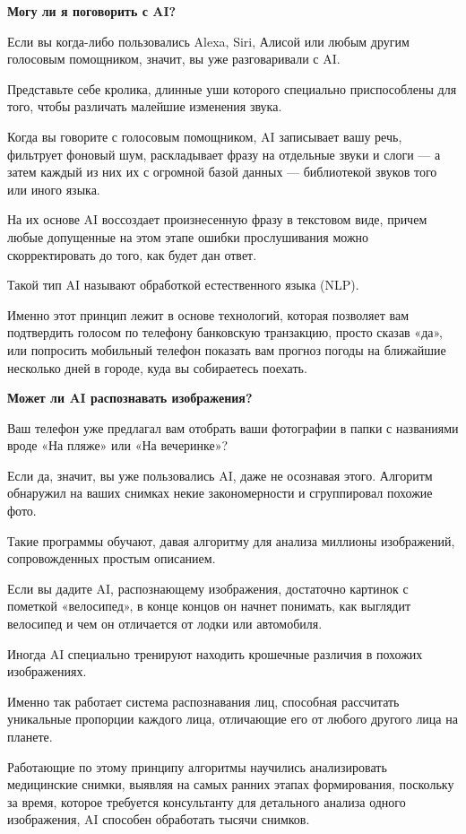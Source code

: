 \textbf{Могу ли я поговорить с AI?}

Если вы когда-либо пользовались Alexa, Siri, Алисой или любым другим голосовым помощником, значит, вы уже разговаривали с AI.

Представьте себе кролика, длинные уши которого специально приспособлены для того, чтобы различать малейшие изменения звука.

Когда вы говорите с голосовым помощником, AI записывает вашу речь, фильтрует фоновый шум, раскладывает фразу на отдельные звуки и слоги --- а затем  каждый из них их с огромной базой данных --- библиотекой звуков того или иного языка.

На их основе AI воссоздает произнесенную фразу в текстовом виде, причем любые допущенные на этом этапе ошибки прослушивания можно скорректировать до того, как будет дан ответ.

Такой тип AI называют обработкой естественного языка (NLP).

Именно этот принцип лежит в основе технологий, которая позволяет вам подтвердить голосом по телефону банковскую транзакцию, просто сказав «да», или попросить мобильный телефон показать вам прогноз погоды на ближайшие несколько дней в городе, куда вы собираетесь поехать.


\textbf{Может ли AI распознавать изображения?}

Ваш телефон уже предлагал вам отобрать ваши фотографии в папки с названиями вроде «На пляже» или «На вечеринке»?

Если да, значит, вы уже пользовались AI, даже не осознавая этого. Алгоритм обнаружил на ваших снимках некие закономерности и сгруппировал похожие фото.

Такие программы обучают, давая алгоритму для анализа миллионы изображений, сопровожденных простым описанием.

Если вы дадите AI, распознающему изображения, достаточно картинок с пометкой «велосипед», в конце концов он начнет понимать, как выглядит велосипед и чем он отличается от лодки или автомобиля.

Иногда AI специально тренируют находить крошечные различия в похожих изображениях.

Именно так работает система распознавания лиц, способная рассчитать уникальные пропорции каждого лица, отличающие его от любого другого лица на планете.

Работающие по этому принципу алгоритмы научились анализировать медицинские снимки, выявляя  на самых ранних этапах формирования, поскольку за время, которое требуется консультанту для детального анализа одного изображения, AI способен обработать тысячи снимков.



